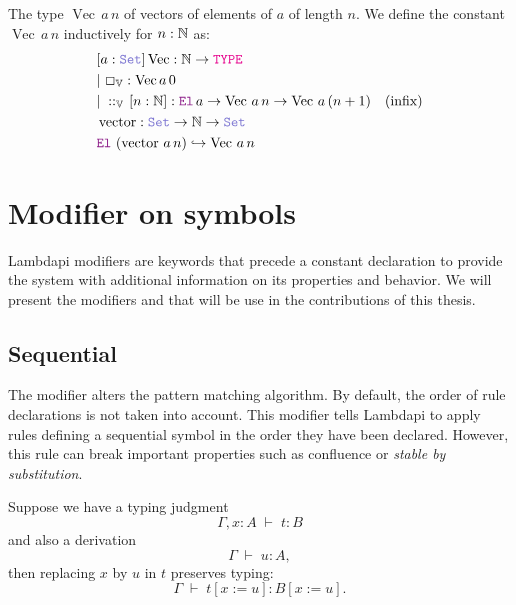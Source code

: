 \begin{definition}\label{def:dependent-vector}
The type \( \mathop{\mathrm{Vec}}\,a\,n \) of vectors of elements of $a$ of length $n$.
We define the constant \( \mathop{\mathrm{Vec}}\,a\,n \) inductively for \( n : \mathbb{N} \) as:
\begin{align*}
&[a: \set] \mathop{\mathrm{Vec}}: \N \ra \type \\
&|~\Box_\bb{V} : \mathop{\mathrm{Vec}} a \, 0 \\
&|~\mathbin{::}_\bb{V}\,[n:\N]: \el\,a \ra \mathop{\mathrm{Vec}}\,a\,n \ra  \mathop{\mathrm{Vec}}\,a\,(n +1) \quad (\text{infix})\\
&\mathop{\mathrm{vector}}: \set \ra \N \ra \set \\
&\el~(\mathop{\mathrm{vector}}\,a\,n) \re \mathop{\mathrm{Vec}}\,a\,n
\end{align*}
\end{definition}

\section{Modifier on symbols}

Lambdapi modifiers are keywords that precede a constant declaration to provide the system with additional information on its properties and behavior.
We will present the modifiers  and  that will be use in the contributions of this thesis.

\subsection{Sequential}

The modifier  alters the pattern matching algorithm.
By default, the order of rule declarations is not taken into account.
This modifier tells Lambdapi to apply rules defining a sequential symbol in the order they have been declared.
However, this rule can break important properties such as confluence or \emph{stable by substitution}.

\begin{lemma}\label{lem:stability}
Suppose we have a typing judgment
\[
  \Gamma, x : A \;\vdash\; t : B
\]
and also a derivation
\[
  \Gamma \;\vdash\; u : A ,
\]
then replacing $x$ by $u$ in $t$ preserves typing:
\[
  \Gamma \;\vdash\; t[x := u] : B[x := u] .
\]
\end{lemma}

